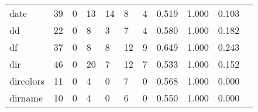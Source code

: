 \begin{longtable}{lp{1.2cm}p{1.2cm}p{1.2cm}p{1.2cm}p{1.2cm}p{1.2cm}p{1.2cm}p{1.2cm}p{1.2cm}p{1.2cm}}
date      &                                    39 &                                                  0 &                                                 13 &                                                 14 &                                                  8 &                                                  4 &                                              0.519 &                                              1.000 &                                              0.103 \\
dd        &                                    22 &                                                  0 &                                                  8 &                                                  3 &                                                  7 &                                                  4 &                                              0.580 &                                              1.000 &                                              0.182 \\
df        &                                    37 &                                                  0 &                                                  8 &                                                  8 &                                                 12 &                                                  9 &                                              0.649 &                                              1.000 &                                              0.243 \\
dir       &                                    46 &                                                  0 &                                                 20 &                                                  7 &                                                 12 &                                                  7 &                                              0.533 &                                              1.000 &                                              0.152 \\
dircolors &                                    11 &                                                  0 &                                                  4 &                                                  0 &                                                  7 &                                                  0 &                                              0.568 &                                              1.000 &                                              0.000 \\
dirname   &                                    10 &                                                  0 &                                                  4 &                                                  0 &                                                  6 &                                                  0 &                                              0.550 &                                              1.000 &                                              0.000 \\

\end{longtable}
